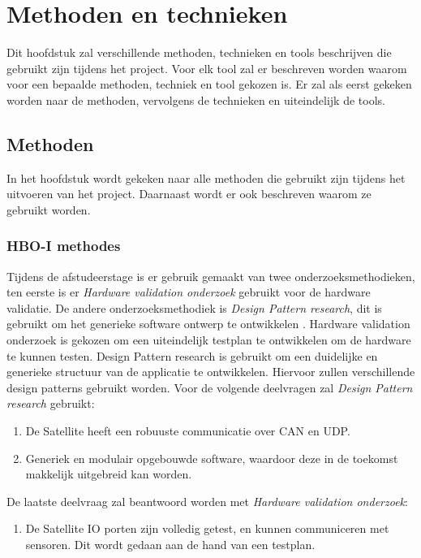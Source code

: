 \chapter{Methoden en technieken}
Dit hoofdstuk zal verschillende methoden, technieken en tools beschrijven die gebruikt zijn tijdens het project. Voor elk tool zal er beschreven worden waarom voor een bepaalde methoden, techniek en tool gekozen is. Er zal als eerst gekeken worden naar de methoden, vervolgens de technieken en uiteindelijk de tools.

\section{Methoden}
In het hoofdstuk wordt gekeken naar alle methoden die gebruikt zijn tijdens het uitvoeren van het project. Daarnaast wordt er ook beschreven waarom ze gebruikt worden.

\subsection{HBO-I methodes}
Tijdens de afstudeerstage is er gebruik gemaakt van twee onderzoeksmethodieken, ten eerste is er \textit{Hardware validation onderzoek} gebruikt voor de hardware validatie. De andere onderzoeksmethodiek is \textit{Design Pattern research}, dit is gebruikt om het generieke software ontwerp te ontwikkelen \parencite{researchmethods}. Hardware validation onderzoek is gekozen om een uiteindelijk testplan te ontwikkelen om de hardware te kunnen testen. Design Pattern research is gebruikt om een duidelijke en generieke structuur van de applicatie te ontwikkelen. Hiervoor zullen verschillende design patterns gebruikt worden. Voor de volgende deelvragen zal \textit{Design Pattern research} gebruikt: 
\begin{enumerate}
	\item De Satellite heeft een robuuste communicatie over CAN en UDP.
	\item Generiek en modulair opgebouwde software, waardoor deze in de toekomst makkelijk uitgebreid kan worden.
\end{enumerate}

\noindent De laatste deelvraag zal beantwoord worden met \textit{Hardware validation onderzoek}:
\begin{enumerate}
	\item De Satellite IO porten zijn volledig getest, en kunnen communiceren met sensoren. Dit wordt gedaan aan de hand van een testplan.
\end{enumerate}

